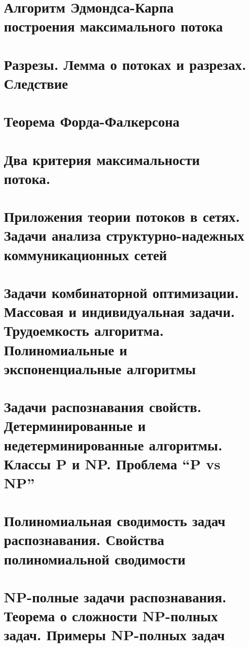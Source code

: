 \documentclass[a4paper]{article}
\theoremstyle{definition}
\theoremstyle{remark}
\begin{document}
    \section{Алгоритм Эдмондса-Карпа построения максимального потока}
    \section{Разрезы. Лемма о потоках и разрезах. Следствие}
    \section{Теорема Форда-Фалкерсона}
    \section{Два критерия максимальности потока.}
    \section{Приложения теории потоков в сетях. Задачи анализа структурно-надежных 
    коммуникационных сетей}
    \section{Задачи комбинаторной оптимизации. Массовая и индивидуальная задачи. 
    Трудоемкость алгоритма. Полиномиальные и экспоненциальные алгоритмы}
    \section{Задачи распознавания свойств. Детерминированные и недетерминированные 
    алгоритмы. Классы P и NP. Проблема “P vs NP”}
    \section{Полиномиальная сводимость задач распознавания. Свойства полиномиальной 
    сводимости}
    \section{NP-полные задачи распознавания. Теорема о сложности NP-полных задач. Примеры 
    NP-полных задач}
\end{document}
